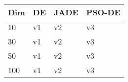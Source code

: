 \begin{table}[h!]
\centering
 \begin{tabular}{|p{0.9cm}|p{1.0cm}|p{1.0cm}|p{1.0cm}}
\hline
Dim & DE & JADE & PSO-DE \\
\hline
10 & v1 & v2 & v3 \\
\hline
30 & v1 & v2 & v3 \\
\hline
50 & v1 & v2 & v3 \\
\hline
100 & v1 & v2 & v3 \\

\end{tabular}
\end{table} 